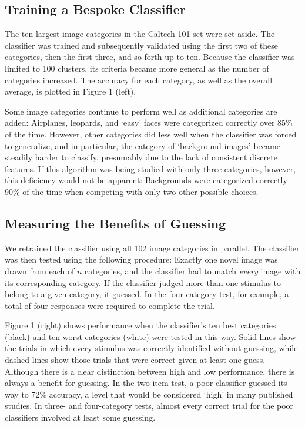 \documentclass[fleqn,10pt]{wlpeerj_noabs}
\begin{document}
\subsection*{Training a Bespoke Classifier}

The ten largest image categories in the Caltech 101 set were set aside. The classifier was trained and subsequently validated using the first two of these categories, then the first three, and so forth up to ten. Because the classifier was limited to 100 clusters, its criteria became more general as the number of categories increased. The accuracy for each category, as well as the overall average, is plotted in Figure 1 (left).

Some image categories continue to perform well as additional categories are added: Airplanes, leopards, and `easy' faces were categorized correctly over 85\% of the time. However, other categories did less well when the classifier was forced to generalize, and in particular, the category of `background images' became steadily harder to classify, presumably due to the lack of consistent discrete features. If this algorithm was being studied with only three categories, however, this deficiency would not be apparent: Backgrounds were categorized correctly 90\% of the time when competing with only two other possible choices.

\subsection*{Measuring the Benefits of Guessing}

We retrained the classifier using all 102 image categories in parallel. The classifier was then tested using the following procedure: Exactly one novel image was drawn from each of $n$ categories, and the classifier had to match \textsl{every} image with its corresponding category. If the classifier judged more than one stimulus to belong to a given category, it guessed. In the four-category test, for example, a total of four responses were required to complete the trial.

Figure 1 (right) shows performance when the classifier's ten best categories (black) and ten worst categories (white) were tested in this way. Solid lines show the trials in which every stimulus was correctly identified without guessing, while dashed lines show those trials that were correct given at least one guess. Although there is a clear distinction between high and low performance, there is always a benefit for guessing. In the two-item test, a poor classifier guessed its way to 72\% accuracy, a level that would be considered `high' in many published studies. In three- and four-category tests, almost every correct trial for the poor classifiers involved at least some guessing.
\end{document}

